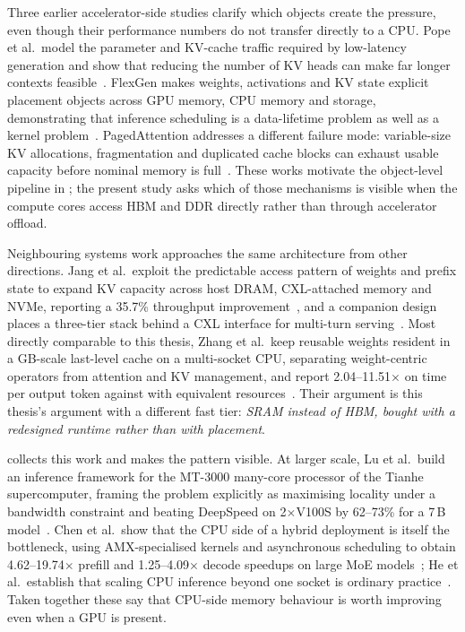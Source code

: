Three earlier accelerator-side studies clarify which objects create the
pressure, even though their performance numbers do not transfer directly to
a CPU.  Pope et al.\ model the parameter and KV-cache traffic required by
low-latency generation and show that reducing the number of KV heads can make
far longer contexts feasible~\cite{pope2023efficient}.  FlexGen makes weights,
activations and KV state explicit placement objects across GPU memory, CPU
memory and storage, demonstrating that inference scheduling is a data-lifetime
problem as well as a kernel problem~\cite{sheng2023flexgen}.  PagedAttention
addresses a different failure mode: variable-size KV allocations, fragmentation
and duplicated cache blocks can exhaust usable capacity before nominal memory
is full~\cite{kwon2023pagedattention}.  These works motivate the object-level
pipeline in ; the present study asks
which of those mechanisms is visible when the compute cores access HBM and DDR
directly rather than through accelerator offload.

Neighbouring systems work approaches the same architecture from other
directions.  Jang et al.\ exploit the predictable access pattern of
weights and prefix state to expand KV capacity across host DRAM,
CXL-attached memory and NVMe, reporting a 35.7\% throughput
improvement~\cite{jang2026itme}, and a companion design places a
three-tier stack behind a CXL interface for multi-turn
serving~\cite{jang2026hymcache}.  Most directly comparable to this
thesis, Zhang et al.\ keep reusable weights resident in a GB-scale
last-level cache on a multi-socket CPU, separating weight-centric
operators from attention and KV management, and report 2.04--11.51$\times$
on time per output token against \lcpp{} with equivalent
resources~\cite{zhang2026cacheresident}.  Their argument is this thesis's argument with a different fast tier:
\emph{SRAM instead of HBM, bought with a redesigned runtime rather than
with placement}.

 collects this work and makes the pattern
visible.  At larger scale, Lu et al.\ build an inference framework for
the MT-3000
many-core processor of the Tianhe supercomputer, framing the problem
explicitly as maximising locality under a bandwidth constraint and
beating DeepSpeed on 2$\times$V100S by 62--73\% for a 7\,B
model~\cite{lu2026thinfer}.  Chen et al.\ show that the CPU side of a
hybrid deployment is itself the bottleneck, using AMX-specialised
kernels and asynchronous scheduling to obtain 4.62--19.74$\times$
prefill and 1.25--4.09$\times$ decode speedups on large
MoE models~\cite{chen2025ktransformers}; He et al.\ establish that
scaling CPU inference beyond one socket is ordinary
practice~\cite{he2024distributedcpu}.  Taken together these say that
CPU-side memory behaviour is worth improving even when a GPU is
present.


